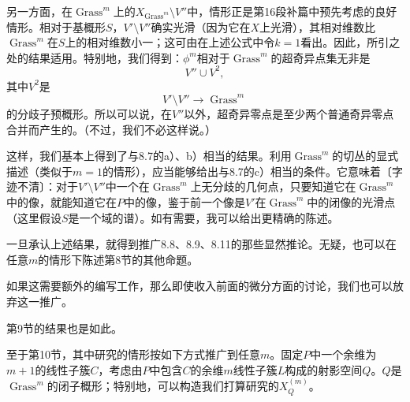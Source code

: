 另一方面，在$\operatorname{Grass}^{m}$上的$X_{\operatorname{Grass}^{m}}\setminus V''$中，情形正是第16段补篇中预先考虑的良好情形。相对于基概形$S$，$V'\setminus V''$确实光滑（因为它在$X$上光滑），其相对维数比$\operatorname{Grass}^{m}$在$S$上的相对维数小一；这可由在上述公式中令$k=1$看出。因此，所引之处的结果适用。特别地，我们得到：$\phi^m$相对于$\operatorname{Grass}^{m}$的超奇异点集无非是
\[
V''\cup V^2,
\]
其中$V^2$是
\[
V'\setminus V''\longrightarrow\operatorname{Grass}^{m}
\]
的分歧子预概形。所以可以说，在$V''$以外，超奇异零点是至少两个普通奇异零点合并而产生的。（不过，我们不必这样说。）

这样，我们基本上得到了与8.7的a）、b）相当的结果。利用$\operatorname{Grass}^{m}$的切丛的显式描述（类似于$m=1$的情形），应当能够给出与8.7的c）相当的条件。它意味着〔字迹不清〕：对于$V'\setminus V''$中一个在$\operatorname{Grass}^{m}$上无分歧的几何点，只要知道它在$\operatorname{Grass}^{m}$中的像，就能知道它在$P$中的像，鉴于前一个像是$V'$在$\operatorname{Grass}^{m}$中的闭像的光滑点（这里假设$S$是一个域的谱）。如有需要，我可以给出更精确的陈述。


一旦承认上述结果，就得到推广8.8、8.9、8.11的那些显然推论。无疑，也可以在任意$m$的情形下陈述第8节的其他命题。

如果这需要额外的编写工作，那么即使收入前面的微分方面的讨论，我们也可以放弃这一推广。

第9节的结果也是如此。

至于第10节，其中研究的情形按如下方式推广到任意$m$。固定$P$中一个余维为$m+1$的线性子簇$C$，考虑由$P$中包含$C$的余维$m$线性子簇$L$构成的射影空间$Q$。$Q$是$\operatorname{Grass}^m$的闭子概形；特别地，可以构造我们打算研究的$X_Q^{(m)}$。

